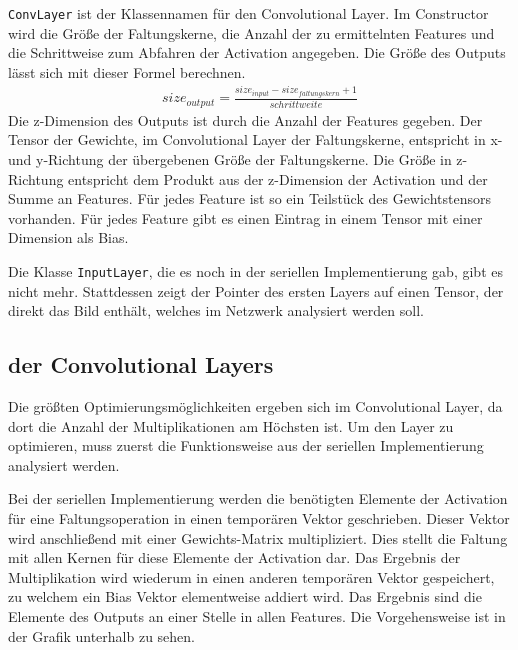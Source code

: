 \documentclass[../main.tex]{subfiles}
\begin{document}
\texttt{ConvLayer} ist der Klassennamen für den Convolutional Layer. Im Constructor wird die Größe der Faltungskerne, die Anzahl der zu ermittelnten Features und die Schrittweise zum Abfahren der Activation angegeben. Die Größe des Outputs lässt sich mit dieser Formel berechnen.
\begin{equation}\label{eq:cnn_outout_size}
\begin{split}
size_{output} = \frac{size_{input} -size_{faltungskern} +1}{schrittweite}
\end{split}
\end{equation}
Die z-Dimension des Outputs ist durch die Anzahl der Features gegeben. Der Tensor der Gewichte, im Convolutional Layer der Faltungskerne, entspricht in x- und y-Richtung der übergebenen Größe der Faltungskerne. Die Größe in z-Richtung entspricht dem Produkt aus der z-Dimension der Activation und der Summe an Features. Für jedes Feature ist so ein Teilstück des Gewichtstensors vorhanden. Für jedes Feature gibt es einen Eintrag in einem Tensor mit einer Dimension als Bias.

Die Klasse \texttt{InputLayer}, die es noch in der seriellen Implementierung gab, gibt es nicht mehr. Stattdessen zeigt der Pointer des ersten Layers auf einen Tensor, der direkt das Bild enthält, welches im Netzwerk analysiert werden soll.

\subsection{der Convolutional Layers}

Die größten Optimierungsmöglichkeiten ergeben sich im Convolutional Layer, da dort die Anzahl der Multiplikationen am Höchsten ist. Um den Layer zu optimieren, muss zuerst die Funktionsweise aus der seriellen Implementierung analysiert werden.

Bei der seriellen Implementierung werden die benötigten Elemente der Activation für eine Faltungsoperation in einen temporären Vektor geschrieben. Dieser Vektor wird anschließend mit einer Gewichts-Matrix multipliziert. Dies stellt die Faltung mit allen Kernen für diese Elemente der Activation dar. Das Ergebnis der Multiplikation wird wiederum in einen anderen temporären Vektor gespeichert, zu welchem ein Bias Vektor elementweise addiert wird. Das Ergebnis sind die Elemente des Outputs an einer Stelle in allen Features. Die Vorgehensweise ist in der Grafik unterhalb zu sehen.
\end{document}
